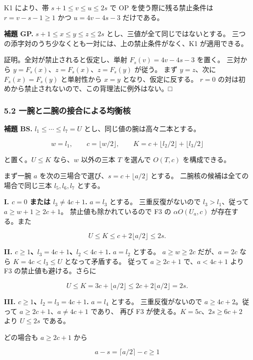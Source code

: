 \documentclass[
  10pt,
  a4paper,
]{article}
\begin{document}
K1 により、帯 \(s+1\le v\le u\le2s\) で OP を使う際に残る禁止条件は
\(r=v-s-1\ge1\) かつ \(u=4v-4s-3\) だけである。

\textbf{補題 GP.} \(s+1\le x\le y\le z\le2s\)
とし、三値が全て同じではないとする。
三つの添字対のうち少なくとも一対には、上の禁止条件がなく、K1
が適用できる。

証明。全対が禁止されると仮定し、単射 \(F_s(v)=4v-4s-3\) を置く。
三対から \(y=F_s(x)\)、\(z=F_s(x)\)、\(z=F_s(y)\) が従う。 まず
\(y=z\)、次に \(F_s(x)=F_s(y)\) と単射性から \(x=y\)
となり、仮定に反する。 \(r=0\)
の対は初めから禁止されないので、この背理法に例外はない。□

\subsubsection{5.2
一腕と二腕の接合による均衡核}\label{ux4e00ux8155ux3068ux4e8cux8155ux306eux63a5ux5408ux306bux3088ux308bux5747ux8861ux6838}

\textbf{補題 BS.} \(l_1\le\cdots\le l_7=U\)
とし、同じ値の腕は高々二本とする。

\[
w=l_1,\qquad c=\lfloor w/2\rfloor,\qquad
K=c+\lfloor l_2/2\rfloor+\lfloor l_3/2\rfloor
\]

と置く。\(U\le K\) なら、\(w\) 以外の三本 \(T\) を選んで \(O(T,c)\)
を構成できる。

まず一腕 \(a\) を次の三場合で選び、\(s=c+\lfloor a/2\rfloor\) とする。
二腕核の候補は全ての場合で同じ三本 \(l_5,l_6,l_7\) とする。

\textbf{I. \(c=0\) または \(l_3\ne4c+1\).} \(a=l_3\) とする。
三重反復がないので \(l_3>l_1\)、従って \(a\ge w+1\ge2c+1\)。
禁止値も除かれているので F3 の \(\alpha O(U_a,c)\) が存在する。また

\[
U\le K\le c+2\lfloor a/2\rfloor\le2s.
\]

\textbf{II. \(c\ge1\)、\(l_3=4c+1\)、\(l_2<4c+1\).} \(a=l_2\) とする。
\(a\ge w\ge2c\) だが、\(a=2c\) なら \(K=4c<l_3\le U\) となって矛盾する。
従って \(a\ge2c+1\) で、\(a<4c+1\) より F3 の禁止値も避ける。さらに

\[
U\le K=3c+\lfloor a/2\rfloor
\le2c+2\lfloor a/2\rfloor=2s.
\]

\textbf{III. \(c\ge1\)、\(l_2=l_3=4c+1\).} \(a=l_4\) とする。
三重反復がないので \(a\ge4c+2\)。従って \(a\ge2c+1\)、\(a\ne4c+1\)
であり、 再び F3 が使える。\(K=5c\)、\(2s\ge6c+2\) より \(U\le2s\)
である。

どの場合も \(a\ge2c+1\) から

\[
a-s=\lceil a/2\rceil-c\ge1
\]
\end{document}

